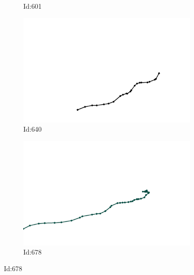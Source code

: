 \documentclass[12pt,twoside]{report}
\begin{document}
\begin{figure}
\begin{subfigure}[b]{0.20\textwidth}
\caption{Id:601}
\end{subfigure}
\begin{subfigure}[b]{0.20\textwidth}
\centering
\includegraphics[width=\textwidth]{../trajectories/640.png}
\caption{Id:640}
\end{subfigure}
\begin{subfigure}[b]{0.20\textwidth}
\centering
\includegraphics[width=\textwidth]{../trajectories/678.png}
\caption{Id:678}
\end{subfigure}
\end{figure}
\end{document}
